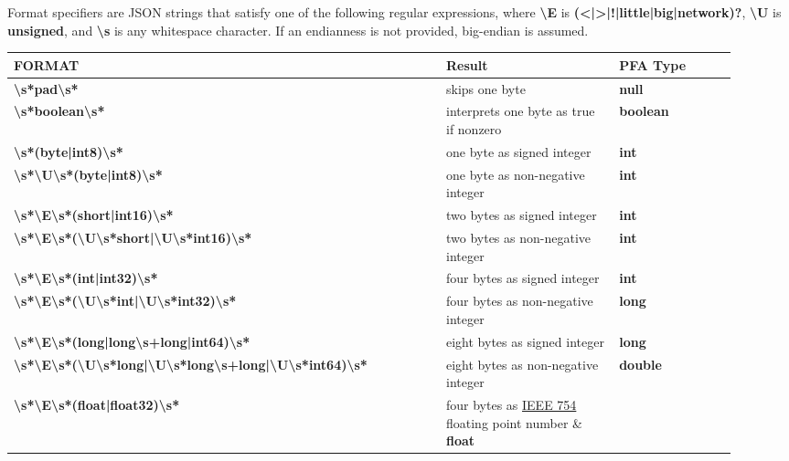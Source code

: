 \documentclass{article}
\newcommand{\PFAc}{\ttfamily\bfseries}
\theoremstyle{definition}
\begin{document}
Format specifiers are JSON strings that satisfy one of the following regular expressions, where {\PFAc \textbackslash E} is {\PFAc (<|>|!|little|big|network)?}, {\PFAc \textbackslash U} is {\PFAc unsigned}, and {\PFAc \textbackslash s} is any whitespace character.  If an endianness is not provided, big-endian is assumed.

\noindent \begin{longtable}{p{0.55\linewidth} p{0.22\linewidth} p{0.15\linewidth}}
{\PFAc FORMAT} & {\bf Result} & {\bf PFA Type} \\\hline
{\PFAc \textbackslash s*pad\textbackslash s*} & skips one byte & {\bf null} \\
{\PFAc \textbackslash s*boolean\textbackslash s*} & interprets one byte as true if nonzero & {\bf boolean} \\
{\PFAc \textbackslash s*(byte|int8)\textbackslash s*} & one byte as signed integer & {\bf int} \\
{\PFAc \textbackslash s*\textbackslash U\textbackslash s*(byte|int8)\textbackslash s*} & one byte as non-negative integer & {\bf int} \\
{\PFAc \textbackslash s*\textbackslash E\textbackslash s*(short|int16)\textbackslash s*} & two bytes as signed integer & {\bf int} \\
{\PFAc \textbackslash s*\textbackslash E\textbackslash s*(\textbackslash U\textbackslash s*short|\textbackslash U\textbackslash s*int16)\textbackslash s*} & two bytes as non-negative integer & {\bf int} \\
{\PFAc \textbackslash s*\textbackslash E\textbackslash s*(int|int32)\textbackslash s*} & four bytes as signed integer & {\bf int} \\
{\PFAc \textbackslash s*\textbackslash E\textbackslash s*(\textbackslash U\textbackslash s*int|\textbackslash U\textbackslash s*int32)\textbackslash s*} & four bytes as non-negative integer & {\bf long} \\
{\PFAc \textbackslash s*\textbackslash E\textbackslash s*(long|long\textbackslash s+long|int64)\textbackslash s*} & eight bytes as signed integer & {\bf long} \\
{\PFAc \textbackslash s*\textbackslash E\textbackslash s*(\textbackslash U\textbackslash s*long|\textbackslash U\textbackslash s*long\textbackslash s+long|\textbackslash U\textbackslash s*int64)\textbackslash s*} & eight bytes as non-negative integer & {\bf double} \\
{\PFAc \textbackslash s*\textbackslash E\textbackslash s*(float|float32)\textbackslash s*} & four bytes as \href{http://dx.doi.org/10.1109%2FIEEESTD.2008.4610935}{IEEE 754} floating point number & {\bf float} \\

\end{longtable}
\end{document}
